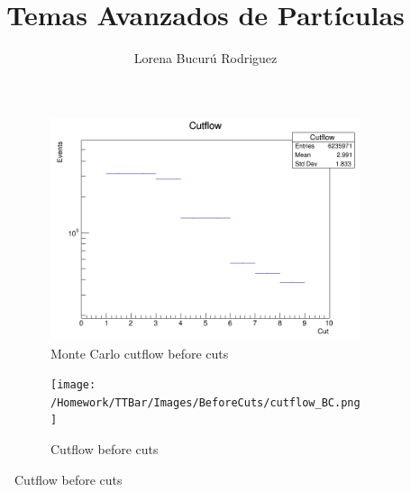 \documentclass{article}
\title{\textbf{Temas Avanzados de Partículas}}
\author{Lorena Bucurú Rodriguez}
\begin{document}
\maketitle

\begin{figure}[ht]
\begin{subfigure}{.5\textwidth}
  \centering
  \includegraphics[width=.8\linewidth]{Images/MonteCarloBeforeCuts/cutflow_BC_MC.png}
  \caption{Monte Carlo cutflow before cuts}
  \label{fig:cutflow_BC_MC}
\end{subfigure}
\begin{subfigure}{.5\textwidth}
  \centering
  \texttt{[image: /Homework/TTBar/Images/BeforeCuts/cutflow\_BC.png]}
  \caption{Cutflow before cuts}
  \label{fig:BeforeCuts/cutflow_BC}
\end{subfigure}
\label{fig:first}
\end{figure}

\end{document}
